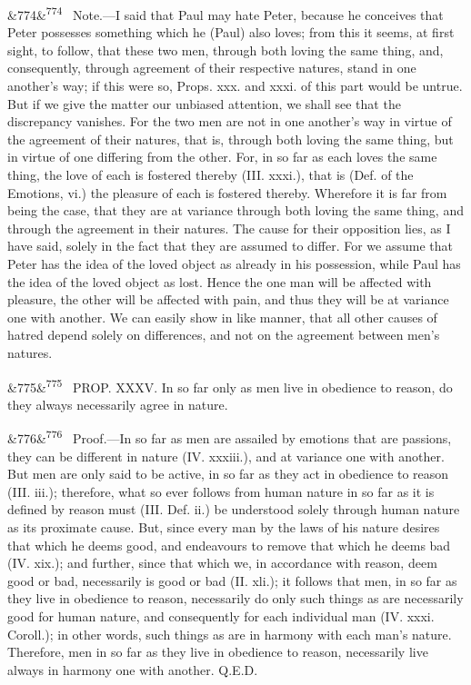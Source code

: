 \documentclass[12pt]{article}
\newcommand{\para}[1][]{\par\noindent\ifx&#1&\else\textsuperscript{\footnotesize #1}~\fi}
\begin{document}
\para[774] Note.---I said that Paul may hate Peter, because he conceives that Peter possesses something which he (Paul) also loves; from this it seems, at first sight, to follow, that these two men, through both loving the same thing, and, consequently, through agreement of their respective natures, stand in one another's way; if this were so, Props. xxx. and xxxi. of this part would be untrue. But if we give the matter our unbiased attention, we shall see that the discrepancy vanishes. For the two men are not in one another's way in virtue of the agreement of their natures, that is, through both loving the same thing, but in virtue of one differing from the other. For, in so far as each loves the same thing, the love of each is fostered thereby (III. xxxi.), that is (Def. of the Emotions, vi.) the pleasure of each is fostered thereby. Wherefore it is far from being the case, that they are at variance through both loving the same thing, and through the agreement in their natures. The cause for their opposition lies, as I have said, solely in the fact that they are assumed to differ. For we assume that Peter has the idea of the loved object as already in his possession, while Paul has the idea of the loved object as lost. Hence the one man will be affected with pleasure, the other will be affected with pain, and thus they will be at variance one with another. We can easily show in like manner, that all other causes of hatred depend solely on differences, and not on the agreement between men's natures.

\para[775] PROP. XXXV. In so far only as men live in obedience to reason, do they always necessarily agree in nature.

\para[776] Proof.---In so far as men are assailed by emotions that are passions, they can be different in nature (IV. xxxiii.), and at variance one with another. But men are only said to be active, in so far as they act in obedience to reason (III. iii.); therefore, what so ever follows from human nature in so far as it is defined by reason must (III. Def. ii.) be understood solely through human nature as its proximate cause. But, since every man by the laws of his nature desires that which he deems good, and endeavours to remove that which he deems bad (IV. xix.); and further, since that which we, in accordance with reason, deem good or bad, necessarily is good or bad (II. xli.); it follows that men, in so far as they live in obedience to reason, necessarily do only such things as are necessarily good for human nature, and consequently for each individual man (IV. xxxi. Coroll.); in other words, such things as are in harmony with each man's nature. Therefore, men in so far as they live in obedience to reason, necessarily live always in harmony one with another. Q.E.D.
\end{document}
